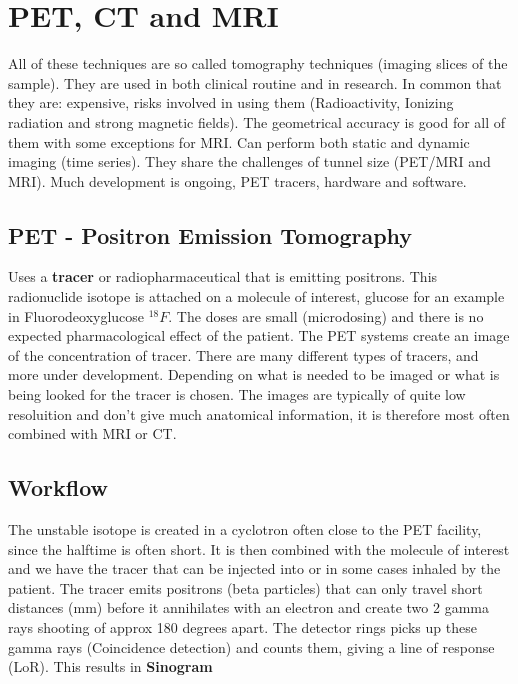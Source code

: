 \section{PET, CT and MRI}
All of these techniques are so called tomography techniques (imaging slices of the sample). They are used in both clinical routine and in research. In common that they are: expensive, risks involved in using them (Radioactivity, Ionizing radiation and strong magnetic fields). The geometrical accuracy is good for all of them with some exceptions for MRI. Can perform both static and dynamic imaging (time series). They share the challenges of tunnel size (PET/MRI and MRI). Much development is ongoing, PET tracers, hardware and software. 

	\subsection*{PET - Positron Emission Tomography}
	Uses a \textbf{tracer} or radiopharmaceutical that is emitting positrons. This radionuclide isotope is attached on a molecule of interest, glucose for an example in Fluorodeoxyglucose $^{18}F$. The doses are small (microdosing) and there is no expected pharmacological effect of the patient. The PET systems create an image of the concentration of tracer. There are many different types of tracers, and more under development. Depending on what is needed to be imaged or what is being looked for the tracer is chosen. The images are typically of quite low resoluition and don't give much anatomical information, it is therefore most often combined with MRI or CT. 

	\subsection*{Workflow}
	The unstable isotope is created in a cyclotron often close to the PET facility, since the halftime is often short. It is then combined with the molecule of interest and we have the tracer that can be injected into or in some cases inhaled by the patient. The tracer emits positrons (beta particles) that can only travel short distances (mm) before it annihilates with an electron and create two 2 gamma rays shooting of approx 180 degrees apart. The detector rings picks up these gamma rays (Coincidence detection) and counts them, giving a line of response (LoR). This results in \textbf{Sinogram} 
